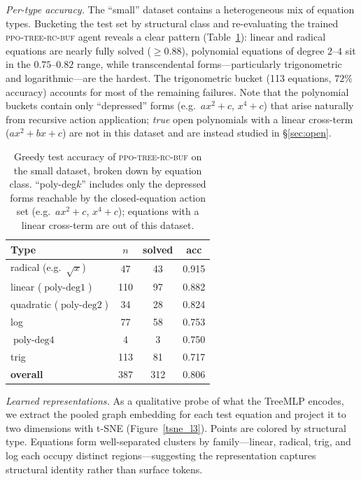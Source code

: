 \documentclass{article}
\theoremstyle{plain}
\theoremstyle{definition}
\theoremstyle{remark}
\newcommand{\op}[1]{\operatorname{#1}}
\begin{document}
\textit{Per-type accuracy.} The ``small'' dataset contains a heterogeneous mix of equation types. Bucketing the test set by structural class and re-evaluating the trained \textsc{ppo-tree-rc-buf} agent reveals a clear pattern (Table~\ref{tab:per_type}): linear and radical equations are nearly fully solved ($\geq 0.88$), polynomial equations of degree $2$--$4$ sit in the $0.75$--$0.82$ range, while transcendental forms—particularly trigonometric and logarithmic—are the hardest. The trigonometric bucket (113 equations, $72\%$ accuracy) accounts for most of the remaining failures. Note that the polynomial buckets contain only ``depressed'' forms (e.g.~$ax^2+c$, $x^4 + c$) that arise naturally from recursive action application; \emph{true} open polynomials with a linear cross-term ($ax^2+bx+c$) are not in this dataset and are instead studied in §\ref{sec:open}.

\begin{table}[h!]
\centering
\footnotesize
\caption{Greedy test accuracy of \textsc{ppo-tree-rc-buf} on the small dataset, broken down by equation class. ``poly-deg$k$'' includes only the depressed forms reachable by the closed-equation action set (e.g.\ $ax^2 + c$, $x^4 + c$); equations with a linear cross-term are out of this dataset.}
\label{tab:per_type}
\begin{tabular}{l c c c}
\toprule
Type & $n$ & solved & acc \\
\midrule
radical (e.g.\ $\sqrt{x}$)    &  47 &  43 & 0.915 \\
linear ($\op{poly-deg1}$)     & 110 &  97 & 0.882 \\
quadratic ($\op{poly-deg2}$)  &  34 &  28 & 0.824 \\
log                            &  77 &  58 & 0.753 \\
$\op{poly-deg4}$              &   4 &   3 & 0.750 \\
trig                          & 113 &  81 & 0.717 \\
\midrule
\textbf{overall}              & 387 & 312 & 0.806 \\
\bottomrule
\end{tabular}
\end{table}

\textit{Learned representations.} As a qualitative probe of what the TreeMLP encodes, we extract the pooled graph embedding for each test equation and project it to two dimensions with t-SNE (Figure~\ref{tsne_l3}). Points are colored by structural type. Equations form well-separated clusters by family—linear, radical, trig, and log each occupy distinct regions—suggesting the representation captures structural identity rather than surface tokens.
\end{document}
